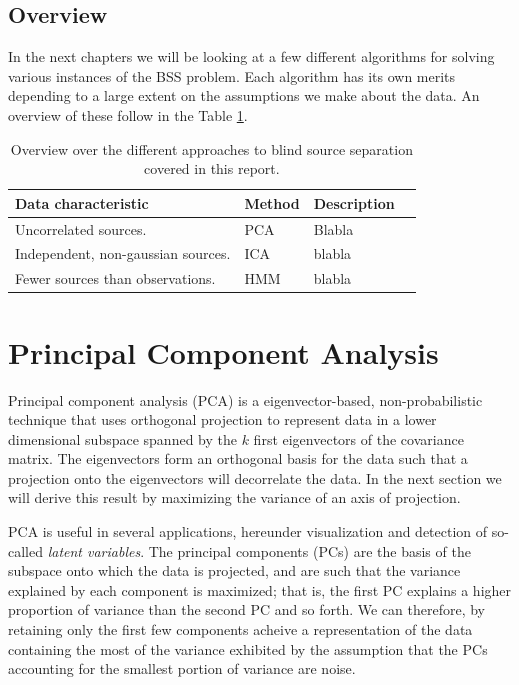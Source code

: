 \documentclass[11pt, oneside, a4paper]{report}
\begin{document}
\section{Overview}

In the next chapters we will be looking at a few different algorithms for solving various instances of the BSS problem. Each algorithm has its own merits depending to a large extent on the assumptions we make about the data. An overview of these follow in the Table \ref{overviewTable}.

\begin{center}
  \begin{table}[h!]
    \begin{tabular}{ | l | l | l | p{5cm} |}
      \hline
      \textbf{Data characteristic} & \textbf{Method} & \textbf{Description} \\ \hline
      Uncorrelated sources. & PCA & Blabla \\ 
      Independent, non-gaussian sources. & ICA & blabla \\
      Fewer sources than observations. & HMM & blabla \\
      \hline
    \end{tabular}
    \caption{Overview over the different approaches to blind source separation covered in this report.}
    \label{overviewTable}
  \end{table}
\end{center}

\chapter{Principal Component Analysis}

Principal component analysis \cite{pearson1901} (PCA) is a eigenvector-based,
non-probabilistic technique that uses orthogonal projection to
represent data in a lower dimensional subspace spanned by the $k$
first eigenvectors of the covariance matrix. The eigenvectors form an
orthogonal basis for the data such that a projection onto the
eigenvectors will decorrelate the data. In the next section we will
derive this result by maximizing the variance of an axis of projection.

PCA is useful in several applications, hereunder visualization and
detection of so-called \emph{latent variables}. The principal
components (PCs) are the basis of the subspace onto which the data is
projected, and are such that the variance explained by each component
is maximized; that is, the first PC explains a higher proportion of
variance than the second PC and so forth. We can therefore, by
retaining only the first few components acheive a representation of
the data containing the most of the variance exhibited by the
assumption that the PCs accounting for the smallest portion of
variance are noise.
\end{document}
